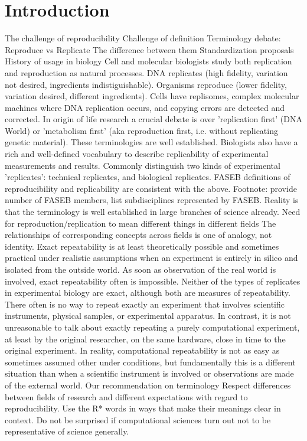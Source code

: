 \section{Introduction}

The challenge of reproducibility
	Challenge of definition
		Terminology debate: Reproduce vs Replicate
			The difference between them
			Standardization proposals
			History of usage in biology
				Cell and molecular biologists study both replication and reproduction as natural processes.
				DNA replicates (high fidelity, variation not desired, ingredients indistiguishable).
				Organisms reproduce (lower fidelity, variation desired, different ingredients).
				Cells have replisomes, complex molecular machines where DNA replication occurs, and copying errors are detected and corrected.
				In origin of life research a crucial debate is over 'replication first' (DNA World) or 
 					'metabolism first' (aka reproduction first, i.e. without replicating genetic material).
				These terminologies are well established.
				Biologists also have a rich and well-defined vocabulary to describe replicability of experimental measurements and results.
				Commonly distinguish two kinds of experimental 'replicates':  technical replicates, and biological replicates.
				FASEB definitions of reproducibility and replicability are consistent with the above.
				Footnote: provide number of FASEB members, list subdisciplines represented by FASEB.
 				Reality is that the terminology is well established in large branches of science already.
			Need for reproduction/replication to mean different things in different fields
				The relationships of corresponding concepts across fields is one of analogy, not identity.
				Exact repeatability is at least theoretically possible and sometimes practical under realistic assumptions when an experiment 
					is entirely in silico and isolated from the outside world.
				As soon as observation of the real world is involved, exact repeatability often is impossible.
				Neither of the types of replicates in experimental biology are exact, although both are measures of repeatability.
				There often is no way to repeat exactly an experiment that involves scientific instruments, physical samples, or experimental apparatus.
				In contrast, it is not unreasonable to talk about exactly repeating a purely computational experiment, at least by the original researcher,
					on the same hardware, close in time to the original experiment.
				In reality, computational repeatability is not as easy as sometimes assumed other under conditions, but fundamentally this is
					a different situation than when a scientific instrument is involved or observations are made of the external world.
			Our recommendation on terminology
				Respect differences between fields of research and different expectations with regard to reproducibility.
				Use the R* words in ways that make their meanings clear in context.
				Do not be surprised if computational sciences turn out not to be representative of science generally.